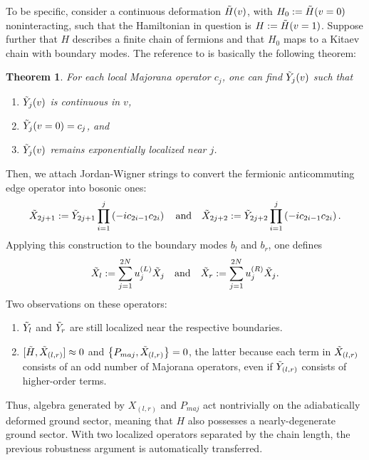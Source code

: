\documentclass{article}
\newtheorem{theorem}{Theorem}[section]
\begin{document}
To be specific, consider a continuous deformation $\Tilde{H}(v)$, with $H_0 := \Tilde{H}(v=0)$ noninteracting,
such that the Hamiltonian in question is $H := \Tilde{H}(v=1)$.
Suppose further that $H$ describes a finite chain of fermions
and that $H_0$ maps to a Kitaev chain with boundary modes.
The reference to \textcite{hastings_wen} is basically the following theorem:
\begin{theorem}
    For each local Majorana operator $c_j$, one can find $\Tilde{Y}_j(v)$ such that
    \begin{enumerate}
        \item $\Tilde{Y}_j(v)$ is continuous in $v$,
        \item $\Tilde{Y}_j(v=0) = c_j$, and
        \item $\Tilde{Y}_j(v)$ remains exponentially localized near $j$.
    \end{enumerate}
\end{theorem}
Then, we attach Jordan-Wigner strings to convert the fermionic anticommuting edge operator
into bosonic ones:
\[
    \Tilde{X}_{2j+1} := \Tilde{Y}_{2j+1} \prod_{i=1}^j\left(-ic_{2i-1}c_{2i}\right)\quad \text{and}\quad
    \Tilde{X}_{2j+2} := \Tilde{Y}_{2j+2} \prod_{i=1}^j\left(-ic_{2i-1}c_{2i}\right).
\]
Applying this construction to the boundary modes $b_l$ and $b_r$, one defines
\[
    \Tilde{X}_l := \sum_{j=1}^{2N} u_j^{(L)} \Tilde{X}_j\quad \text{and}\quad
    \Tilde{X}_r := \sum_{j=1}^{2N} u_j^{(R)} \Tilde{X}_j.
\]
Two observations on these operators:
\begin{enumerate}
    \item $\Tilde{Y}_l$ and $\Tilde{Y}_r$ are still localized near the respective boundaries.
    \item $[\Tilde{H}, \Tilde{X}_{(l, r)}] \approx 0$ and $\left\{P_{maj}, \Tilde{X}_{(l,r)}\right\} = 0$,
        the latter because each term in $\Tilde{X}_{(l, r)}$ consists of an odd number of Majorana operators,
        even if $\Tilde{Y}_{(l,r)}$ consists of higher-order terms.
\end{enumerate}
Thus, algebra generated by $X_{(l,r)}$ and $P_{maj}$ act nontrivially on the adiabatically deformed ground sector,
meaning that $H$ also possesses a nearly-degenerate ground sector.
With two localized operators separated by the chain length,
the previous robustness argument is automatically transferred.
\end{document}
